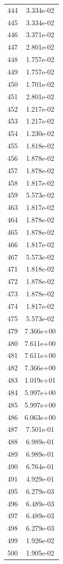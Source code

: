 \documentclass[12pt]{article}
\begin{document}
\begin{longtable}{@{}cc@{}}
444 & 3.334e-02 \\
445 & 3.334e-02 \\
446 & 3.371e-02 \\
447 & 2.801e-02 \\
448 & 1.757e-02 \\
449 & 1.757e-02 \\
450 & 1.701e-02 \\
451 & 2.801e-02 \\
452 & 1.217e-02 \\
453 & 1.217e-02 \\
454 & 1.230e-02 \\
455 & 1.818e-02 \\
456 & 1.878e-02 \\
457 & 1.878e-02 \\
458 & 1.817e-02 \\
459 & 5.573e-02 \\
463 & 1.817e-02 \\
464 & 1.878e-02 \\
465 & 1.878e-02 \\
466 & 1.817e-02 \\
467 & 5.573e-02 \\
471 & 1.818e-02 \\
472 & 1.878e-02 \\
473 & 1.878e-02 \\
474 & 1.817e-02 \\
475 & 5.573e-02 \\
479 & 7.366e+00 \\
480 & 7.611e+00 \\
481 & 7.611e+00 \\
482 & 7.366e+00 \\
483 & 1.019e+01 \\
484 & 5.997e+00 \\
485 & 5.997e+00 \\
486 & 6.063e+00 \\
487 & 7.501e-01 \\
488 & 6.989e-01 \\
489 & 6.989e-01 \\
490 & 6.764e-01 \\
491 & 4.929e-01 \\
495 & 6.279e-03 \\
496 & 6.489e-03 \\
497 & 6.489e-03 \\
498 & 6.279e-03 \\
499 & 1.926e-02 \\
500 & 1.905e-02 \\

\end{longtable}
\end{document}
